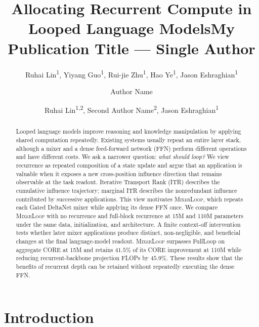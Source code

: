 \documentclass[letterpaper]{article} %
\title{Allocating Recurrent Compute in Looped Language Models}
\author{
    Ruhai Lin\textsuperscript{\rm 1}\equalcontrib,
    Yiyang Guo\textsuperscript{\rm 1}\equalcontrib,
    Rui-jie Zhu\textsuperscript{\rm 1},
    Hao Ye\textsuperscript{\rm 1},
    Jason Eshraghian\textsuperscript{\rm 1}\corresponding
}
\title{My Publication Title --- Single Author}
\author {
    Author Name
}
\title{}
\author {
    Ruhai Lin\textsuperscript{\rm 1,\rm 2}\equalcontrib,
    Second Author Name\textsuperscript{\rm 2}\equalcontrib,
    Jason Eshraghian\textsuperscript{\rm 1}\corresponding
}
\newcommand{\method}{\textsc{MixerLoop}}
\begin{document}
\raggedbottom

\maketitle

\begin{abstract}
    Looped language models improve reasoning and knowledge manipulation by applying shared computation repeatedly. Existing systems usually repeat an entire layer stack, although a mixer and a dense feed-forward network (FFN) perform different operations and have different costs. We ask a narrower question: \emph{what should loop?} We view recurrence as repeated composition of a state update and argue that an application is valuable when it exposes a new cross-position influence direction that remains observable at the task readout. Iterative Transport Rank (ITR) describes the cumulative influence trajectory; marginal ITR describes the nonredundant influence contributed by successive applications. This view motivates \method{}, which repeats each Gated DeltaNet mixer while applying its dense FFN once. We compare \method{} with no recurrence and full-block recurrence at 15M and 110M parameters under the same data, initialization, and architecture. A finite context-off intervention tests whether later mixer applications produce distinct, non-negligible, and beneficial changes at the final language-model readout. \method{} surpasses FullLoop on aggregate CORE at 15M and retains $41.5\%$ of its CORE improvement at 110M while reducing recurrent-backbone projection FLOPs by $45.9\%$. These results show that the benefits of recurrent depth can be retained without repeatedly executing the dense FFN.
\end{abstract}


\section{Introduction}
\end{document}
